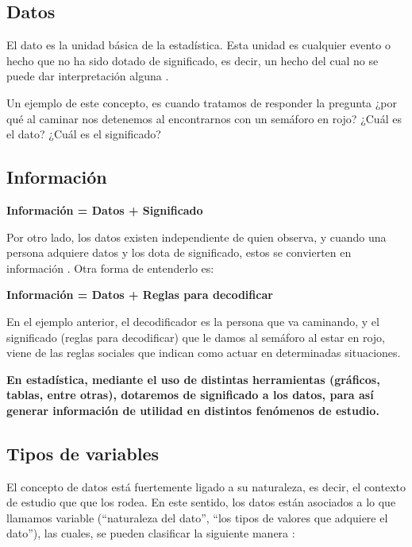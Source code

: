 \documentclass[
]{book}
\begin{document}
\hypertarget{datos}{%
\subsection{Datos}\label{datos}}

El dato es la unidad básica de la estadística. Esta unidad es cualquier evento o hecho que no ha sido dotado de significado, es decir, un hecho del cual no se puede dar interpretación alguna \citep{brachman_knowledge_2004}.

Un ejemplo de este concepto, es cuando tratamos de responder la pregunta ¿por qué al caminar nos detenemos al encontrarnos con un semáforo en rojo? ¿Cuál es el dato? ¿Cuál es el significado?

\hypertarget{informaciuxf3n}{%
\subsection{Información}\label{informaciuxf3n}}

\textbf{Información = Datos + Significado}

Por otro lado, los datos existen independiente de quien observa, y cuando una persona adquiere datos y los dota de significado, estos se convierten en información \citep{brachman_knowledge_2004}. Otra forma de entenderlo es:

\textbf{Información = Datos + Reglas para decodificar}

En el ejemplo anterior, el decodificador es la persona que va caminando, y el significado (reglas para decodificar) que le damos al semáforo al estar en rojo, viene de las reglas sociales que indican como actuar en determinadas situaciones.

\textbf{En estadística, mediante el uso de distintas herramientas (gráficos, tablas, entre otras), dotaremos de significado a los datos, para así generar información de utilidad en distintos fenómenos de estudio.}

\hypertarget{tipos-de-variables}{%
\subsection{Tipos de variables}\label{tipos-de-variables}}

El concepto de datos está fuertemente ligado a su naturaleza, es decir, el contexto de estudio que que los rodea. En este sentido, los datos están asociados a lo que llamamos variable (``naturaleza del dato'', ``los tipos de valores que adquiere el dato''), las cuales, se pueden clasificar la siguiente manera \citep[página 7]{anderson}:
\end{document}
